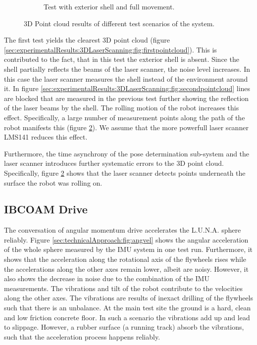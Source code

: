 \begin{figure}
\begin{subfigure}[b]{0.6\textwidth}
	\caption{Test with exterior shell and full movement.}
	\label{sec:experimentalResults:3DLaserScanning:fig:thirdpointcloud}
\end{subfigure}
\caption{3D Point cloud results of different test scenarios of the system.}
\end{figure}

The first test yields the clearest 3D point cloud (figure \ref{sec:experimentalResults:3DLaserScanning:fig:firstpointcloud}).
This is contributed to the fact, that in this test the exterior shell is absent.
Since the shell partially reflects the beams of the laser scanner, the noise level increases.
In this case the laser scanner measures the shell instead of the environment around it.
In figure \ref{sec:experimentalResults:3DLaserScanning:fig:secondpointcloud} lines are blocked that are measured in the previous test further showing the reflection of the laser beams by the shell.
The rolling motion of the robot increases this effect.
Specifically, a large number of measurement points along the path of the robot manifests this (figure \ref{sec:experimentalResults:3DLaserScanning:fig:thirdpointcloud}).
We assume that the more powerfull laser scanner LMS141 reduces this effect. 

Furthermore, the time asynchrony of the pose determination sub-system and the laser scanner introduces further systematic errors to the 3D point cloud.
Specifically, figure \ref{sec:experimentalResults:3DLaserScanning:fig:thirdpointcloud} shows that the laser scanner detects points underneath the surface the robot was rolling on. 

\subsection{IBCOAM Drive}
\label{sec:experimentalResults:IBCOAMDrive}

The conversation of angular momentum drive accelerates the L.U.N.A. sphere reliably.
Figure \ref{sec:technicalApproach:fig:angvel} shows the angular acceleration of the whole sphere measured by the IMU system in one test run. 
Furthermore, it shows that the acceleration along the rotational axis of the flywheels rises while the accelerations along the other axes remain lower, albeit are noisy. 
However, it also shows the decrease in noise due to the combination of the IMU measurements.
The vibrations and tilt of the robot contribute to the velocities along the other axes.
The vibrations are results of inexact drilling of the flywheels such that there is an unbalance.
At the main test site the ground is a hard, clean and low friction concrete floor.
In such a scenario the vibrations add up and lead to slippage.
However, a rubber surface (a running track) absorb the vibrations, such that the acceleration process happens reliably.
